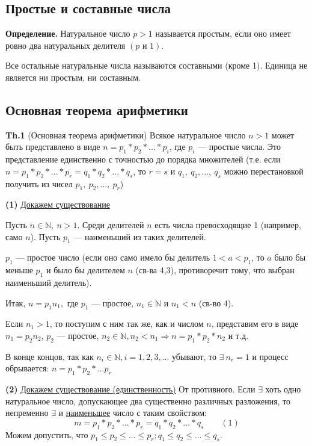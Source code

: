 \documentclass{article}
\begin{document}
  	    \subsection{Простые и составные числа}
        	\textbf{Определение.} Натуральное число \( p > 1 \) называется простым, если оно имеет ровно два натуральных делителя \( (p \textrm{ и } 1) \).

  			Все остальные натуральные числа называются составными (кроме 1). Единица не является ни простым, ни составным.
            
        \subsection{Основная теорема арифметики}
        	\textbf{Th.1} (Основная теорема арифметики) Всякое натуральное число \( n > 1 \) может быть представлено в виде \( n = p_1*p_2* ... *p_i \), где \( p_i \) --- простые числа. Это представление единственно с точностью до порядка множителей (т.е. если \( n = p_1*p_2*...*p_r = q_1*q_2*...*q_s \), то \( r = s \) и \(q_1,\ q_2,...,\ q_s \) можно перестановкой получить из чисел \( p_1,\ p_2,...,\ p_r \))

            \textbf{(1)} \underline{Докажем существование} 

            Пусть \(n \in \mathbb{N},\ n > 1 \). Среди делителей \( n \) есть числа превосходящие 1 (например, само \( n \)). Пусть \( p_1 \) --- наименьший из таких делителей.

            \( p_1 \) --- простое число (если оно само имело бы делитель \( 1 < a < p_1 \), то \( a \) было бы меньше \( p_1 \) и было бы делителем \( n \) (св-ва 4,3), противоречит тому, что выбран наименьший делитель).

            Итак, \( n = p_1n_1, \textrm{ где } p_1 \textrm{ --- простое, } n_1 \in \mathbb{N} \textrm{ и } n_1 < n \) (св-во 4).

            Если \( n_1 > 1 \), то поступим с ним так же, как и числом \( n \), представим его в виде \( n_1 = p_2n_2 \), \( p_2 \) --- простое, \( n_2 \in \mathbb{N}, n_2 < n_1 \Rightarrow n = p_1*p_2*n_2 \) и т.д.

            В конце концов, так как \( n_i \in \mathbb{N}, i=1,2,3,... \) убывают, то \( \exists\ n_r = 1 \) и процесс обрывается: \( n=p_1*p_2*...p_r \)

            \textbf{(2)} \underline{Докажем существование (единственность)}
            От противного. Если \( \exists \) хоть одно натуральное число, допускающее два существенно различных разложения, то непременно \( \exists \) и \underline{наименьшее} число с таким свойством: \[ m = p_1*p_2*...*p_r = q_1*q_2*...*q_s \qquad (1) \]
            Можем допустить, что \( p_1 \leq p_2 \leq ... \leq p_r; q_1 \leq q_2 \leq ... \leq q_s \).
\end{document}
